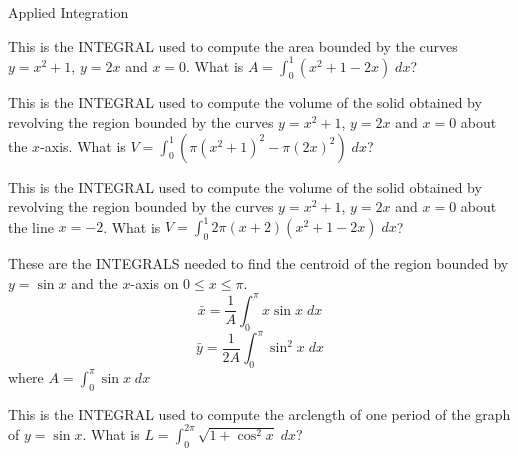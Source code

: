 \documentclass{article}
\begin{document}
\begin{category}{Applied Integration}

  \begin{clue}
    This is the INTEGRAL used to compute the area bounded by the curves
    $y=x^2+1$, $y=2x$ and $x=0$.
  \response
    What is $\displaystyle A=\int_0^1 (x^2+1-2x)\; dx$?
  \end{clue}

  \begin{clue}
    This is the INTEGRAL used to compute the volume of the solid obtained by
    revolving the region bounded by the curves $y=x^2+1$, $y=2x$ and $x=0$
    about the $x$-axis.
  \response
    What is $\displaystyle V=\int_0^1 (\pi(x^2+1)^2-\pi(2x)^2)\; dx$?
  \end{clue}

  \begin{clue}[dailydouble]
    This is the INTEGRAL used to compute the volume of the solid obtained by
    revolving the region bounded by the curves $y=x^2+1$, $y=2x$ and $x=0$
    about the line $x=-2$.
  \response
    What is $\displaystyle V=\int_0^1 2\pi (x+2)(x^2+1-2x)\; dx$?
  \end{clue}

  \begin{clue}
    These are the INTEGRALS needed to find the centroid of the region bounded
    by $y=\sin x$ and the $x$-axis on $0\le x\le \pi$.
  \response
    \[\bar x=\frac{1}{A}\int_{0}^{\pi}x\sin x\; dx\]
    \[\bar y=\frac{1}{2A}\int_{0}^{\pi}\sin^{2}x\;dx\]
    where $\displaystyle A=\int_{0}^{\pi}\sin x\; dx$
  \end{clue}

  \begin{clue}
    This is the INTEGRAL used to compute the arclength of one period of the
    graph of $y=\sin x$.
  \response
    What is $\displaystyle L=\int_0^{2\pi}\sqrt{1+\cos^2 x}\; dx$?
  \end{clue}

\end{category}
\end{document}
